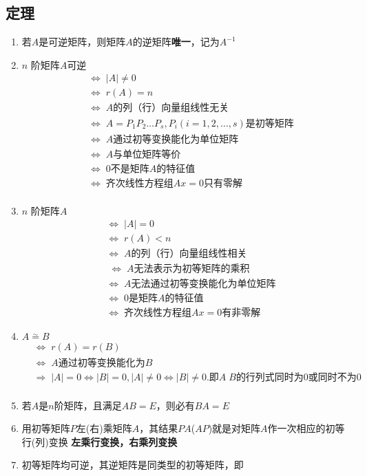 \documentclass[a4paper,12pt]{article}
\begin{document}
    \subsection{定理}

    \begin{enumerate}
        \item 若$A$是可逆矩阵，则矩阵$A$的逆矩阵\textbf{唯一}，记为$A^{-1}$
        \item $n$ 阶矩阵$A$可逆
        \begin{align*}
            &\Leftrightarrow\; |A| \neq 0  \\
            &\Leftrightarrow\; r(A) = n  \\
            &\Leftrightarrow\; A \text{的列（行）向量组线性无关}  \\
            &\Leftrightarrow\; A = P_{1}P_{2}\dots P_{s}, P_{i}(i = 1,2,\dots,s)\text{是初等矩阵}  \\
            &\Leftrightarrow\; A \text{通过初等变换能化为单位矩阵}  \\
            &\Leftrightarrow\; A \text{与单位矩阵等价}  \\
            &\Leftrightarrow\; 0\text{不是矩阵} A \text{的特征值}  \\
            &\Leftrightarrow\; \text{齐次线性方程组} Ax = 0 \text{只有零解}  \\
        \end{align*}
        \item $n$ 阶矩阵$A${\color{red}{不可逆}}
        \begin{align*}
            &\Leftrightarrow\; |A| = 0  \\
            &\Leftrightarrow\; r(A) < n  \\
            &\Leftrightarrow\; A \text{的列（行）向量组线性相关}  \\
            &\;\Leftrightarrow\; A \text{无法表示为初等矩阵的乘积} \\
            &\Leftrightarrow\; A \text{无法通过初等变换能化为单位矩阵}  \\
            &\Leftrightarrow\; 0\text{是矩阵} A \text{的特征值}  \\
            &\Leftrightarrow\; \text{齐次线性方程组} Ax = 0 \text{有非零解}
        \end{align*}
        \item $A \overset{\sim}{=} B$
        \begin{align*}
            &\Leftrightarrow\; r(A) = r(B)  \\
            &\Leftrightarrow\; A \text{通过初等变换能化为} B  \\
            &\Rightarrow\; |A| = 0 \Leftrightarrow |B| = 0, |A| \neq 0 \Leftrightarrow |B| \neq 0. \text{即}A\;B\text{的行列式同时为0或同时不为0}  \\
        \end{align*}
        \item 若$A$是$n$阶矩阵，且满足$AB = E$，则必有$BA = E$
        \item 用初等矩阵$P$左(右)乘矩阵$A$，其结果$PA$($AP$)就是对矩阵$A$作一次相应的初等行(列)变换 \; \Rightarrow \textbf{左乘行变换，右乘列变换}
        \item 初等矩阵均可逆，其逆矩阵是同类型的初等矩阵，即


\end{enumerate}
\end{document}
